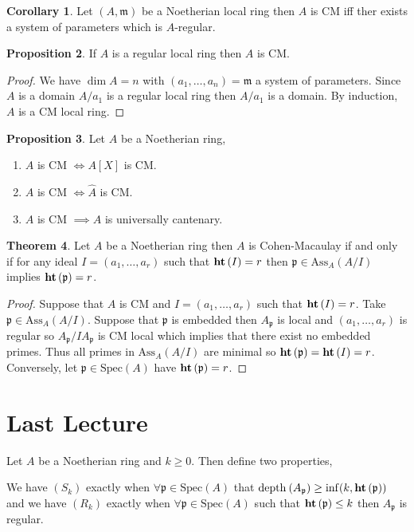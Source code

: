 \documentclass[12pt]{article}
\newcommand{\Ass}[2]{\mathrm{Ass}_{#1}\left( #2 \right)}
\newcommand{\Spec}[1]{\mathrm{Spec}\left( #1 \right)}
\newcommand{\depth}[2]{\mathrm{depth}_{#1}\left(#2\right)}
\newcommand{\p}{\mathfrak{p}}
\newcommand{\m}{\mathfrak{m}}
\theoremstyle{remark}
\theoremstyle{definition}
\newtheorem{theorem}{Theorem}[section]
\newtheorem{proposition}[theorem]{Proposition}
\newtheorem{corollary}[theorem]{Corollary}
\newenvironment{definition}[1][Definition:]{\begin{trivlist}
\item[\hskip \labelsep {\bfseries #1}]}{\end{trivlist}}
\begin{document}
\begin{corollary}
Let $(A, \m)$ be a Noetherian local ring then $A$ is CM iff ther exists a system of parameters which is $A$-regular.
\end{corollary}

\begin{proposition}
If $A$ is a regular local ring then $A$ is CM.
\end{proposition}

\begin{proof}
We have $\dim{A} = n$ with $(a_1, \dots, a_n) = \m$ a system of parameters. Since $A$ is a domain $A / a_1$ is a regular local ring then $A / a_1$ is a domain. By induction, $A$ is a CM local ring.
\end{proof}

\begin{proposition}
Let $A$ be a Noetherian ring,
\begin{enumerate}
\item $A$ is CM $\iff A[X]$ is CM.
\item $A$ is CM $\iff \hat{A}$ is CM.
\item $A$ is CM $\implies A$ is universally cantenary.
\end{enumerate}
\end{proposition}

\begin{theorem}
Let $A$ be a Noetherian ring then $A$ is Cohen-Macaulay if and only if for any ideal $I = (a_1, \dots, a_r)$ such that $\mathbf{ht}\left( I \right) = r$ then $\p \in \Ass{A}{A/I}$ implies $\height{\p} = r$. 
\end{theorem}

\begin{proof}
Suppose that $A$ is CM and $I = (a_1, \dots, a_r)$ such that $\mathbf{ht}\left( I \right) = r$. Take $\p \in \Ass{A}{A / I}$. Suppose that $\p$ is embedded then $A_{\p}$ is local and $(a_1, \dots, a_r)$ is regular so $A_{\p} / I A_{\p}$ is CM local which implies that there exist no embedded primes. Thus all primes in $\Ass{A}{A / I}$ are minimal so $\height{\p} = \height{I} = r$. 
\bigskip\\
Conversely, let $\p \in \Spec{A}$ have $\height{\p} = r$. 
\end{proof}

\section{Last Lecture}

Let $A$ be a Noetherian ring and $k \ge 0$. Then define two properties,
\begin{definition}
We have $(S_k)$ exactly when $\forall \p \in \Spec{A}$ that $\depth{}{A_{\p}} \ge \inf(k, \height{\p})$ and we have $(R_k)$ exactly when $\forall \p \in \Spec{A}$ such that $\height{\p} \le k$ then $A_{\p}$ is regular.
\end{definition}
\end{document}
